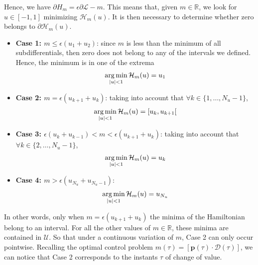 Hence, we have $\partial H_m = \epsilon\partial \mathcal{L} - m$. This means that, given $m\in \mathbb{R}$, we look for $u \in [-1,1]$ minimizing $\mathcal{H}_m(u)$. It is then necessary to determine whether zero belongs to $\partial \mathcal{H}_m(u)$.

\begin{itemize}
    \item \textbf{Case 1: $m \leq \epsilon(u_1+u_2)$}: since $m$ is less than the  minimum of all subdifferentials, then zero does not belong to any of the intervals we defined. Hence, the minimum is in one of the extrema
    \begin{gather}
        \operatorname*{arg\,min}_{|u| < 1} \mathcal{H}_m(u) = u_1
    \end{gather} 
    \item \textbf{Case 2: $m = \epsilon(u_{k+1}+u_k) $}: taking into account that $\forall k \in \{1,\dots,N_u-1\}$,
    \begin{gather}
        \operatorname*{arg\,min}_{|u| < 1} \mathcal{H}_m(u) = [u_k,u_{k+1}[ 
    \end{gather} 
    \item \textbf{Case 3: $\epsilon(u_k+u_{k-1})<m<\epsilon(u_{k+1}+u_k)$}: taking into account that $\forall k \in \{2,\dots,N_u-1\}$,
    \begin{gather}
        \operatorname*{arg\,min}_{|u| < 1} \mathcal{H}_m(u) = u_k
    \end{gather}
    \item \textbf{Case 4: $m>\epsilon(u_{N_u}+u_{N_u-1})$}:
    \begin{gather}
        \operatorname*{arg\,min}_{|u| < 1} \mathcal{H}_m(u) = u_{N_u}
    \end{gather} 
\end{itemize}

In other words, only when $m = \epsilon(u_{k+1}+u_k)$ the minima of the Hamiltonian belong to an interval. For all the other values of $m\in\mathbb{R}$, these minima are contained in $\mathcal{U}$. So that under a continuous variation of $m$, Case 2 can only occur pointwise. Recalling the optimal control problem $m(\tau) = [\bm{p}(\tau) \cdot \bm{\mathcal{D}}(\tau)]$, we can notice that Case 2 corresponds to the instants $\tau$ of change of value.
